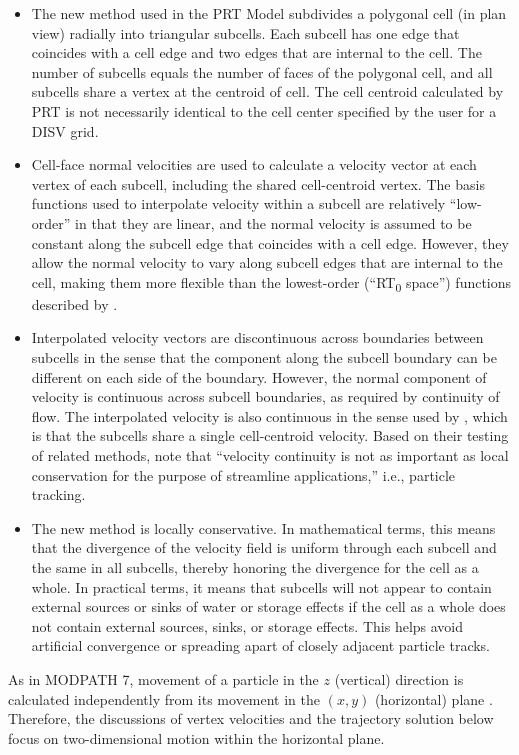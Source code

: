 \begin{itemize}
\item The new method used in the PRT Model subdivides a polygonal cell (in plan view) radially into triangular subcells. Each subcell has one edge that coincides with a cell edge and two edges that are internal to the cell. The number of subcells equals the number of faces of the polygonal cell, and all subcells share a vertex at the centroid of cell. The cell centroid calculated by PRT is not necessarily identical to the cell center specified by the user for a DISV grid.
\item Cell-face normal velocities are used to calculate a velocity vector at each vertex of each subcell, including the shared cell-centroid vertex. The basis functions used to interpolate velocity within a subcell are relatively ``low-order'' in that they are linear, and the normal velocity is assumed to be constant along the subcell edge that coincides with a cell edge. However, they allow the normal velocity to vary along subcell edges that are internal to the cell, making them more flexible than the lowest-order (``RT\textsubscript{0} space'') functions described by \cite{zhang2012}.
\item Interpolated velocity vectors are discontinuous across boundaries between subcells in the sense that the component along the subcell boundary can be different on each side of the boundary. However, the normal component of velocity is continuous across subcell boundaries, as required by continuity of flow. The interpolated velocity is also continuous in the sense used by \cite{zhang2012}, which is that the subcells share a single cell-centroid velocity. Based on their testing of related methods, \cite{zhang2012} note that ``velocity continuity is not as important as local conservation for the purpose of streamline applications,'' i.e., particle tracking.
\item The new method is locally conservative. In mathematical terms, this means that the divergence of the velocity field is uniform through each subcell and the same in all subcells, thereby honoring the divergence for the cell as a whole. In practical terms, it means that subcells will not appear to contain external sources or sinks of water or storage effects if the cell as a whole does not contain external sources, sinks, or storage effects. This helps avoid artificial convergence or spreading apart of closely adjacent particle tracks.
\end{itemize}

As in MODPATH 7, movement of a particle in the $z$ (vertical) direction is calculated independently from its movement in the $(x, y)$ (horizontal) plane \citep{pollock2016modpath7} . Therefore, the discussions of vertex velocities and the trajectory solution below focus on two-dimensional motion within the horizontal plane.

